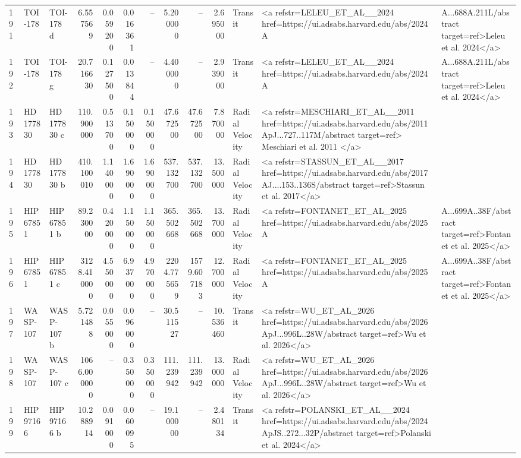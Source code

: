 \begin{tabular}{lllrrrrrrrll}
191 & TOI-178 & TOI-178 d & 6.557569 & 0.059200 & 0.016361 & -- & 5.200000 & -- & 2.695000 & Transit & <a refstr=LELEU_ET_AL__2024 href=https://ui.adsabs.harvard.edu/abs/2024A&A...688A.211L/abstract target=ref>Leleu et al. 2024</a> \\
192 & TOI-178 & TOI-178 g & 20.716630 & 0.127500 & 0.013844 & -- & 4.400000 & -- & 2.939000 & Transit & <a refstr=LELEU_ET_AL__2024 href=https://ui.adsabs.harvard.edu/abs/2024A&A...688A.211L/abstract target=ref>Leleu et al. 2024</a> \\
193 & HD 177830 & HD 177830 c & 110.900000 & 0.513700 & 0.150000 & 0.150000 & 47.672500 & 47.672500 & 7.870000 & Radial Velocity & <a refstr=MESCHIARI_ET_AL__2011 href=https://ui.adsabs.harvard.edu/abs/2011ApJ...727..117M/abstract target=ref> Meschiari et al. 2011 </a> \\
194 & HD 177830 & HD 177830 b & 410.100010 & 1.140000 & 1.690000 & 1.690000 & 537.132700 & 537.132700 & 13.500000 & Radial Velocity & <a refstr=STASSUN_ET_AL__2017 href=https://ui.adsabs.harvard.edu/abs/2017AJ....153..136S/abstract target=ref>Stassun et al. 2017</a> \\
195 & HIP 67851 & HIP 67851 b & 89.230000 & 0.420000 & 1.150000 & 1.150000 & 365.502668 & 365.502668 & 13.700000 & Radial Velocity & <a refstr=FONTANET_ET_AL_2025 href=https://ui.adsabs.harvard.edu/abs/2025A&A...699A..38F/abstract target=ref>Fontanet et al. 2025</a> \\
196 & HIP 67851 & HIP 67851 c & 3128.410000 & 4.550000 & 6.937000 & 4.970000 & 2204.775659 & 1579.607183 & 12.700000 & Radial Velocity & <a refstr=FONTANET_ET_AL_2025 href=https://ui.adsabs.harvard.edu/abs/2025A&A...699A..38F/abstract target=ref>Fontanet et al. 2025</a> \\
197 & WASP-107 & WASP-107 b & 5.721488 & 0.055000 & 0.096000 & -- & 30.511527 & -- & 10.536460 & Transit & <a refstr=WU_ET_AL_2026 href=https://ui.adsabs.harvard.edu/abs/2026ApJ...996L..28W/abstract target=ref>Wu et al. 2026</a> \\
198 & WASP-107 & WASP-107 c & 1066.000000 & -- & 0.350000 & 0.350000 & 111.239942 & 111.239942 & 13.000000 & Radial Velocity & <a refstr=WU_ET_AL_2026 href=https://ui.adsabs.harvard.edu/abs/2026ApJ...996L..28W/abstract target=ref>Wu et al. 2026</a> \\
199 & HIP 97166 & HIP 97166 b & 10.288914 & 0.091000 & 0.060095 & -- & 19.100000 & -- & 2.480134 & Transit & <a refstr=POLANSKI_ET_AL__2024 href=https://ui.adsabs.harvard.edu/abs/2024ApJS..272...32P/abstract target=ref>Polanski et al. 2024</a> \\

\end{tabular}
